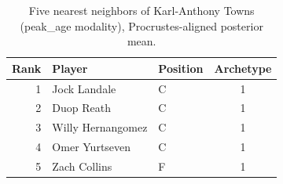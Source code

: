 \begin{table}[htbp]
  \centering\small
  \begin{tabular}{rllc}
    \toprule
    Rank & Player & Position & Archetype \\
    \midrule
    1 & Jock Landale & C & 1 \\
    2 & Duop Reath & C & 1 \\
    3 & Willy Hernangomez & C & 1 \\
    4 & Omer Yurtseven & C & 1 \\
    5 & Zach Collins & F & 1 \\
    \bottomrule
  \end{tabular}
  \caption{Five nearest neighbors of Karl-Anthony Towns (peak_age modality), Procrustes-aligned posterior mean.}
  \label{tab:Karl_Anthony_Towns_neighbors_peak_age}
\end{table}

